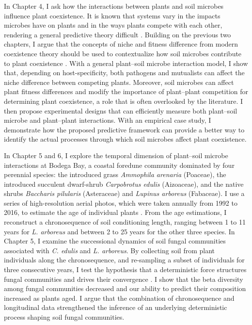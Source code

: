 In Chapter 4, I ask how the interactions between plants and soil microbes influence plant coexistence. It is known that systems vary in the impacts microbes have on plants and in the ways plants compete with each other, rendering a general predictive theory difficult \citep{Lekberg2018}. Building on the previous two chapters, I argue that the concepts of niche and fitness difference from modern coexistence theory should be used to contextualize how soil microbes contribute to plant coexistence \citep{KeMiki2015}. 
With a general plant--soil microbe interaction model, I show that, depending on host-specificity, both pathogens and mutualists can affect the niche difference between competing plants. Moreover, soil microbes can affect plant fitness differences and modify the importance of plant--plant competition for determining plant coexistence, a role that is often overlooked by the literature. I then propose experimental designs that can efficiently measure both plant--soil microbe and plant--plant interactions. With an empirical case study, I demonstrate how the proposed predictive framework can provide a better way to identify the actual processes through which soil microbes affect plant coexistence.
\par


In Chapter 5 and 6, I explore the temporal dimension of plant--soil microbe interactions at Bodega Bay, a coastal foredune community dominated by four perennial species: the introduced grass \textit{Ammophila arenaria} (Poaceae), the introduced succulent dwarf-shrub \textit{Carpobrotus edulis} (Aizoaceae), and the native shrubs \textit{Baccharis pilularis} (Asteraceae) and \textit{Lupinus arboreus} (Fabaceae). I use a series of high-resolution aerial photos, which were taken annually from 1992 to 2016, to estimate the age of individual plants \citep{Danin1998}. From the age estimations, I reconstruct a chronosequence of soil conditioning length, ranging between 1 to 11 years for \textit{L. arboreus} and between 2 to 25 years for the other three species.
In Chapter 5, I examine the successional dynamics of soil fungal communities associated with \textit{C. edulis} and \textit{L. arboreus}. By collecting soil from plant individuals along the chronosequence, and re-sampling a subset of individuals for three consecutive years, I test the hypothesis that a deterministic force structures fungal communities and drives their convergence \citep{Connell1977, DiniAndreote2015, Li2016}. 
I show that the beta diversity among fungal communities decreased and our ability to predict their composition increased as plants aged. I argue that the combination of chronosequence and longitudinal data strengthened the inference of an underlying deterministic process shaping soil fungal communities.
\par 


